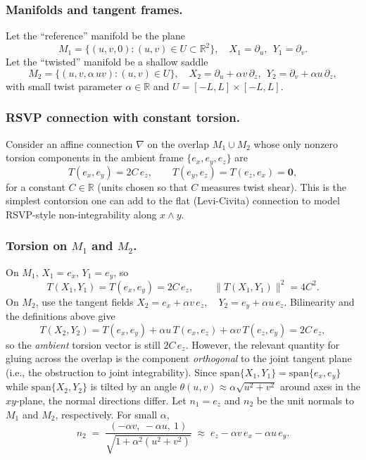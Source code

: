 \documentclass[a4paper,11pt]{article}
\begin{document}
\subsubsection{Manifolds and tangent frames.}
Let the ``reference'' manifold be the plane
\begin{equation}
M_1=\{(u,v,0): (u,v)\in U\subset\mathbb{R}^2\},\quad
X_1=\partial_u,\ \ Y_1=\partial_v.
\end{equation}
Let the ``twisted'' manifold be a shallow saddle
\begin{equation}
M_2=\{(u,v,\alpha\,uv): (u,v)\in U\},\quad
X_2=\partial_u+\alpha v\,\partial_z,\ \ Y_2=\partial_v+\alpha u\,\partial_z,
\end{equation}
with small twist parameter $\alpha\in\mathbb{R}$ and $U=[-L,L]\times[-L,L]$.

\subsubsection{RSVP connection with constant torsion.}
Consider an affine connection $\nabla$ on the overlap $M_1\cup M_2$ whose only
nonzero torsion components in the ambient frame $\{e_x,e_y,e_z\}$ are
\begin{equation}
T(e_x,e_y)=2C\,e_z,\qquad T(e_y,e_z)=T(e_z,e_x)=\mathbf{0},
\end{equation}
for a constant $C\in\mathbb{R}$ (units chosen so that $C$ measures twist
shear). This is the simplest contorsion one can add to the flat (Levi-Civita)
connection to model RSVP-style non-integrability along $x\wedge y$.

\subsubsection{Torsion on $M_1$ and $M_2$.}
On $M_1$, $X_1=e_x$, $Y_1=e_y$, so
\begin{equation}
T(X_1,Y_1)=T(e_x,e_y)=2C\,e_z,\qquad \|T(X_1,Y_1)\|^2=4C^2.
\end{equation}
On $M_2$, use the tangent fields
\(
X_2=e_x+\alpha v\,e_z,\quad Y_2=e_y+\alpha u\,e_z.
\)
Bilinearity and the definitions above give
\begin{equation}
T(X_2,Y_2)=T(e_x,e_y)+\alpha u\,T(e_x,e_z)+\alpha v\,T(e_z,e_y)
=2C\,e_z,
\end{equation}
so the \emph{ambient} torsion vector is still $2C\,e_z$. However, the relevant
quantity for gluing across the overlap is the component \emph{orthogonal} to
the joint tangent plane (i.e., the obstruction to joint integrability). Since
$\mathrm{span}\{X_1,Y_1\}=\mathrm{span}\{e_x,e_y\}$ while
$\mathrm{span}\{X_2,Y_2\}$ is tilted by an angle
$\theta(u,v)\approx \alpha \sqrt{u^2+v^2}$ around axes in the $xy$-plane, the
normal directions differ. Let $n_1=e_z$ and $n_2$ be the unit normals to $M_1$
and $M_2$, respectively. For small $\alpha$,
\begin{equation}
n_2 \;=\; \frac{(-\alpha v,\ -\alpha u,\ 1)}{\sqrt{1+\alpha^2(u^2+v^2)}} 
\;\approx\; e_z - \alpha v\,e_x - \alpha u\,e_y.
\end{equation}
\end{document}
